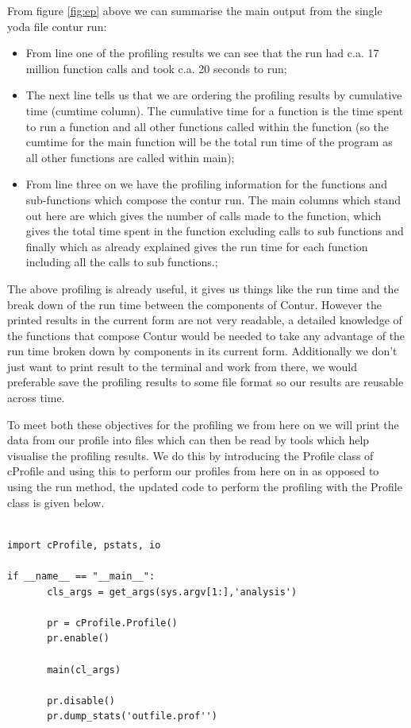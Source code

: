 From figure \ref{fig:ep} above we can summarise the main output from the single yoda file contur run:

\begin{itemize}
\item From line one of the profiling results we can see that the run had c.a. 17 million function calls and took c.a. 20 seconds to run;
\item The next line tells us that we are ordering the profiling results by cumulative time (cumtime column). The cumulative time for a function is the time spent to run a function and all other functions called within the function (so the cumtime for the main function will be the total run time of the program as all other functions are called within main);
\item From line three on we have the profiling information for the functions and sub-functions which compose the contur run. The main columns which stand out here are  which gives the number of calls made to the function,  which gives the total time spent in the function excluding calls to sub functions and finally  which as already explained gives the run time for each function including all the calls to sub functions.;
\end{itemize}

The above profiling is already useful, it gives us things like the run time and the break down of the run time between the components of Contur. However the printed results in the current form are not very readable, a detailed knowledge of the functions that compose Contur would be needed to take any advantage of the run time broken down by components in its current form. Additionally we don't just want to print result to the terminal and work from there, we would preferable save the profiling results to some file format so our results are reusable across time. 

To meet both these objectives for the profiling we  from here on we will print the data from our profile into  files which can then be read by tools which help visualise the profiling results. We do this by introducing the Profile class of cProfile and using this to perform our profiles from here on in as opposed to using the run method, the updated code to perform the profiling with the Profile class is given below.

\begin{verbatim}

import cProfile, pstats, io

if __name__ == "__main__":
       cls_args = get_args(sys.argv[1:],'analysis')
       
       pr = cProfile.Profile()
       pr.enable()
       
       main(cl_args)
       
       pr.disable()
       pr.dump_stats('outfile.prof'')
\end{verbatim}


